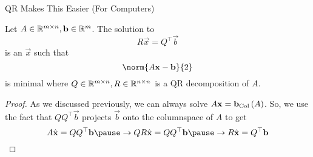 \documentclass[xcoler=dvipsnames, aspectratio=169]{beamer}
\begin{document}
    \begin{frame}{QR Makes This Easier (For Computers)}
        \small
        \begin{theorem}
            Let $A\in\mathbb{R}^{m\times n}, \mathbf{b}\in\mathbb{R}^m$. The solution to
            \[
                R\vec{x} = Q^\top\vec{b}
            \]
            is an $\vec{x}$ such that
            \[
                \norm{A\vec{x}-\vec{b}}{2}
            \]
            is minimal where $Q\in\mathbb{R}^{m\times n},R\in\mathbb{R}^{n\times n}$ is a QR decomposition of $A$.
        \end{theorem}
        \begin{proof}
            As we discussed previously, we can always solve $A\mathbf{x} = \mathbf{b}_\mathrm{Col}\left(A\right)$.\pause
            So, we use the fact that $QQ^\top\vec{b}$ projects $\vec{b}$ onto the columnspace of $A$ to get\pause
            \[
                A\hat{\vec{x}} = QQ^\top\vec{b}\pause\rightarrow QR\hat{\vec{x}} = QQ^\top\vec{b}\pause
                \rightarrow R\hat{\vec{x}} = Q^\top\vec{b}
            \]
        \end{proof}
    \end{frame}
\end{document}
